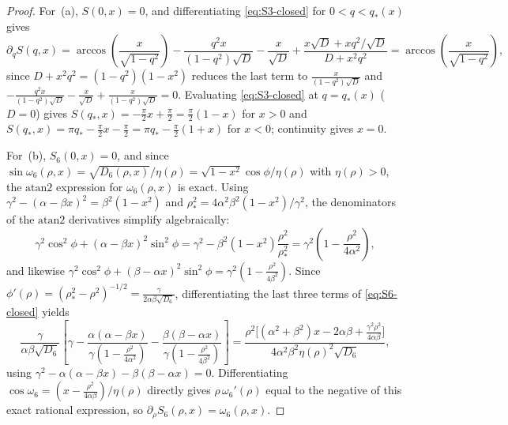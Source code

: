 \documentclass[11pt]{article}
\theoremstyle{definition}
\theoremstyle{remark}
\newcommand{\atanTwo}{\mathrm{atan2}}
\renewcommand{\_}{\oldunderscore\penalty0\hskip0pt\relax}
\begin{document}
\begin{proof}
For~(a), $S(0,x)=0$, and differentiating \eqref{eq:S3-closed} for $0<q<q_*(x)$ gives
\begin{equation}
  \partial_q S(q,x) = \arccos\!\left(\frac{x}{\sqrt{1-q^2}}\right) - \frac{q^2 x}{(1-q^2)\sqrt{D}} - \frac{x}{\sqrt{D}} +
    \frac{x\sqrt{D}+x q^2/\sqrt{D}}{D+x^2q^2} = \arccos\!\left(\frac{x}{\sqrt{1-q^2}}\right),
\end{equation}
since $D+x^2q^2=(1-q^2)(1-x^2)$ reduces the last term to $\frac{x}{(1-q^2)\sqrt{D}}$ and $-\frac{q^2
  x}{(1-q^2)\sqrt{D}}-\frac{x}{\sqrt{D}}+\frac{x}{(1-q^2)\sqrt{D}}=0$. Evaluating \eqref{eq:S3-closed} at $q=q_*(x)$ ($D=0$)
  gives $S(q_*,x)=-\frac{\pi}{2}x+\frac{\pi}{2}=\frac{\pi}{2}(1-x)$ for $x>0$ and $S(q_*,x)=\pi
  q_*-\frac{\pi}{2}x-\frac{\pi}{2}=\pi q_*-\frac{\pi}{2}(1+x)$ for $x<0$; continuity gives $x=0$.

For~(b), $S_6(0,x)=0$, and since $\sin\omega_6(\rho,x)=\sqrt{D_6(\rho,x)}/\eta(\rho)=\sqrt{1-x^2}\cos\phi/\eta(\rho)$ with
  $\eta(\rho)>0$, the $\atanTwo$ expression for $\omega_6(\rho,x)$ is exact. Using $\gamma^2-(\alpha-\beta x)^2=\beta^2(1-x^2)$
  and $\rho_*^2=4\alpha^2\beta^2(1-x^2)/\gamma^2$, the denominators of the $\atanTwo$ derivatives simplify algebraically:
\begin{equation}
  \gamma^2\cos^2\phi + (\alpha-\beta x)^2\sin^2\phi = \gamma^2 - \beta^2(1-x^2)\frac{\rho^2}{\rho_*^2} = \gamma^2\!\left(1-\frac{\rho^2}{4\alpha^2}\right),
\end{equation}
and likewise $\gamma^2\cos^2\phi+(\beta-\alpha x)^2\sin^2\phi=\gamma^2(1-\frac{\rho^2}{4\beta^2})$. Since
  $\phi'(\rho)=(\rho_*^2-\rho^2)^{-1/2}=\frac{\gamma}{2\alpha\beta\sqrt{D_6}}$, differentiating the last three terms of
  \eqref{eq:S6-closed} yields
\begin{equation}
  \frac{\gamma}{\alpha\beta\sqrt{D_6}}\left[\gamma - \frac{\alpha(\alpha-\beta x)}{\gamma(1-\frac{\rho^2}{4\alpha^2})} -
    \frac{\beta(\beta-\alpha x)}{\gamma(1-\frac{\rho^2}{4\beta^2})}\right]
  = \frac{\rho^2\bigl[(\alpha^2+\beta^2)x-2\alpha\beta+\frac{\gamma^2\rho^2}{4\alpha\beta}\bigr]}{4\alpha^2\beta^2\eta(\rho)^2\sqrt{D_6}},
\end{equation}
using $\gamma^2-\alpha(\alpha-\beta x)-\beta(\beta-\alpha x)=0$. Differentiating
  $\cos\omega_6=(x-\frac{\rho^2}{4\alpha\beta})/\eta(\rho)$ directly gives $\rho\,\omega_6'(\rho)$ equal to the negative of this
  exact rational expression, so $\partial_\rho S_6(\rho,x)=\omega_6(\rho,x)$.


\end{proof}
\end{document}
